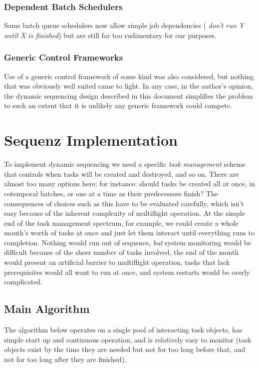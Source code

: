 \documentclass[11pt,a4paper]{article}
\begin{document}
\subsubsection{Dependent Batch Schedulers}

Some batch queue schedulers now allow simple job dependencies ({\em
don't run Y until X is finished}) but are still far too rudimentary for
our purposes. 


\subsubsection{Generic Control Frameworks}

Use of a generic control framework of some kind was also
considered, but nothing that was obviously well suited came to light. In
any case, in the author's opinion, the dynamic sequencing design
described in this document simplifies the problem to such an extent that
it is unlikely any generic framework could compete.  


\section{Sequenz Implementation}

To implement dynamic sequencing we need a specific {\em task management}
scheme that controls when tasks will be created and destroyed, and so
on. There are almost too many options here; for instance: should tasks
be created all at once, in cotemporal batches, or one at a time as their
predecessors finish? The consequences of choices such as this have to
be evaluated carefully, which isn't easy because of the inherent
complexity of multiflight operation. At the simple end of the task
management spectrum, for example, we could create a whole month's worth
of tasks at once and just let them interact until everything runs to
completion. Nothing would run out of sequence, {\em but} system
monitoring would be difficult because of the sheer number of tasks
involved, the end of the month would present an artificial barrier to
multiflight operation, tasks that lack prerequisites would all want to
run at once, and system restarts would be overly complicated. 

\subsection{Main Algorithm}

The algorithm below operates on a single pool of interacting task
objects, has simple start up and continuous operation, and is relatively
easy to monitor (task objects exist by the time they are needed but not
for too long before that, and not for too long after they are finished). 
\end{document}
